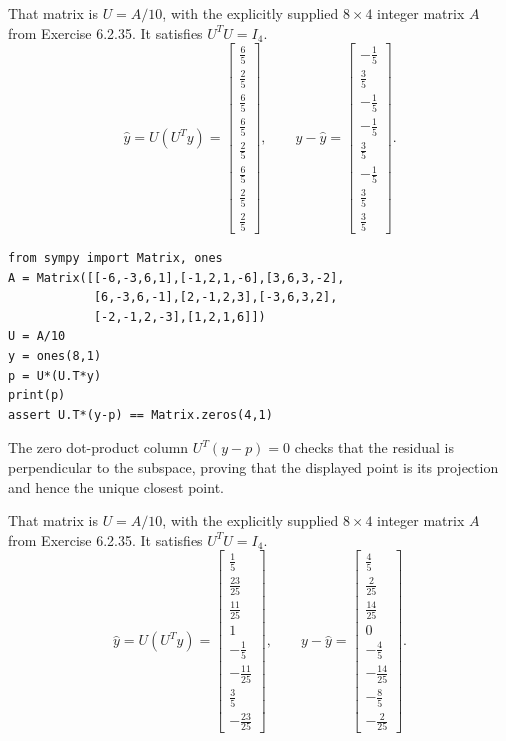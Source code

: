 That matrix is $U=A/10$, with the explicitly supplied $8\times4$ integer matrix $A$ from Exercise 6.2.35. It satisfies $U^TU=I_4$.
\[\widehat y=U(U^Ty)=\left[\begin{array}{r}\frac{6}{5}\\\frac{2}{5}\\\frac{6}{5}\\\frac{6}{5}\\\frac{2}{5}\\\frac{6}{5}\\\frac{2}{5}\\\frac{2}{5}\end{array}\right],\qquad y-\widehat y=\left[\begin{array}{r}- \frac{1}{5}\\\frac{3}{5}\\- \frac{1}{5}\\- \frac{1}{5}\\\frac{3}{5}\\- \frac{1}{5}\\\frac{3}{5}\\\frac{3}{5}\end{array}\right].\]
\begin{verbatim}
from sympy import Matrix, ones
A = Matrix([[-6,-3,6,1],[-1,2,1,-6],[3,6,3,-2],
            [6,-3,6,-1],[2,-1,2,3],[-3,6,3,2],
            [-2,-1,2,-3],[1,2,1,6]])
U = A/10
y = ones(8,1)
p = U*(U.T*y)
print(p)
assert U.T*(y-p) == Matrix.zeros(4,1)
\end{verbatim}
The zero dot-product column $U^T(y-p)=0$ checks that the residual is perpendicular to the subspace, proving that the displayed point is its projection and hence the unique closest point.

That matrix is $U=A/10$, with the explicitly supplied $8\times4$ integer matrix $A$ from Exercise 6.2.35. It satisfies $U^TU=I_4$.
\[\widehat y=U(U^Ty)=\left[\begin{array}{r}\frac{1}{5}\\\frac{23}{25}\\\frac{11}{25}\\1\\- \frac{1}{5}\\- \frac{11}{25}\\\frac{3}{5}\\- \frac{23}{25}\end{array}\right],\qquad y-\widehat y=\left[\begin{array}{r}\frac{4}{5}\\\frac{2}{25}\\\frac{14}{25}\\0\\- \frac{4}{5}\\- \frac{14}{25}\\- \frac{8}{5}\\- \frac{2}{25}\end{array}\right].\]
